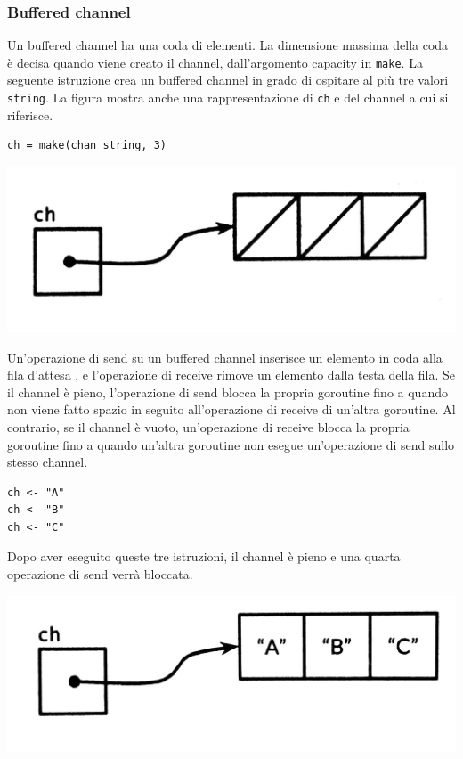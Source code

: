 \documentclass[../../../thesis.tex]{subfiles}
\begin{document}
    \subsubsection{Buffered channel}
    Un buffered channel ha una coda di elementi.
    La dimensione massima della coda è decisa quando viene creato il channel, dall'argomento capacity in \verb"make".
    La seguente istruzione crea un buffered channel in grado di ospitare al più tre valori \verb"string".
    La figura mostra anche una rappresentazione di \verb"ch" e del channel a cui si riferisce.
    \begin{lstlisting}[frame = single, label = {lst:lstlisting7-4-4.1}]
ch = make(chan string, 3)
    \end{lstlisting}
    \begin{center}
        \includegraphics[scale = 0.125]{figure-8.2}
    \end{center}
    Un'operazione di send su un buffered channel inserisce un elemento in coda alla fila d'attesa , e l'operazione di receive rimove un elemento dalla testa della fila.
    Se il channel è pieno, l'operazione di send blocca la propria goroutine fino a quando non viene fatto spazio in seguito all'operazione di receive di un'altra goroutine.
    Al contrario, se il channel è vuoto, un'operazione di receive blocca la propria goroutine fino a quando un'altra goroutine non esegue un'operazione di send sullo stesso channel.
    \begin{lstlisting}[frame = single, label = {lst:lstlisting7-4-4.2}]
ch <- "A"
ch <- "B"
ch <- "C"
    \end{lstlisting}
    Dopo aver eseguito queste tre istruzioni, il channel è pieno e una quarta operazione di send verrà bloccata.
    \begin{center}
        \includegraphics[scale = 0.125]{figure-8.3}
    \end{center}
\end{document}
